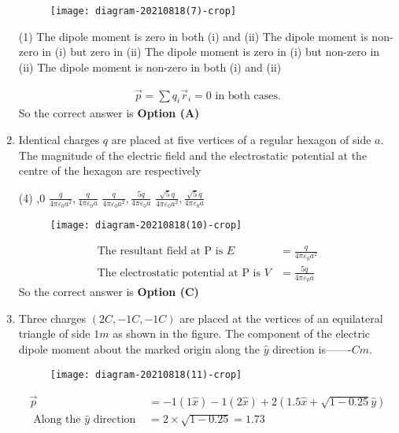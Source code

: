 \begin{enumerate}
\begin{figure}[H]
\centering
\texttt{[image: diagram-20210818(7)-crop]}
\end{figure}
\begin{tasks}(1)
\task[\textbf{A.}] The dipole moment is zero in both (i) and (ii)
\task[\textbf{B.}] The dipole moment is non-zero in (i) but zero in (ii)
\task[\textbf{C.}] The dipole moment is zero in (i) but non-zero in (ii)
\task[\textbf{D.}] The dipole moment is non-zero in both (i) and (ii)
\end{tasks}
\begin{answer}
\begin{align*}
\vec{p}=\sum q_{i} \vec{r}_{i}=0\text{ in both cases.}
\end{align*}
So the correct answer is \textbf{Option (A)}
\end{answer}
	\item Identical charges $q$ are placed at five vertices of a regular hexagon of side $a$. The magnitude of the electric field and the electrostatic potential at the centre of the hexagon are respectively
{}

\begin{tasks}(4)
,0
\task[\textbf{B.}] $\frac{q}{4 \pi \varepsilon_{0} a^{2}}, \frac{q}{4 \pi \varepsilon_{0} a}$
\task[\textbf{C.}] $\frac{q}{4 \pi \varepsilon_{0} a^{2}}, \frac{5 q}{4 \pi \varepsilon_{0} a}$
\task[\textbf{D.}]  $\frac{\sqrt{5} q}{4 \pi \varepsilon_{0} a^{2}}, \frac{\sqrt{5} q}{4 \pi \varepsilon_{0} a}$
\end{tasks}
\begin{answer}
\begin{figure}[H]
	\centering
	\texttt{[image: diagram-20210818(10)-crop]}
\end{figure}
\begin{align*}
\text{The resultant field at }\mathrm{P}\text{ is }E&=\frac{q}{4 \pi \varepsilon_{0} a^{2}}\\
\text{The electrostatic potential at }\mathrm{P}\text{ is }V&=\frac{5 q}{4 \pi \varepsilon_{0} a}
\end{align*}
So the correct answer is \textbf{Option (C)}
\end{answer}
	\item Three charges $(2 C,-1 C,-1 C)$ are placed at the vertices of an equilateral triangle of side $1 m$ as shown in the figure. The component of the electric dipole moment about the marked origin along the $\hat{y}$ direction is-------$C m$.
{}

\begin{figure}[H]
\centering
\texttt{[image: diagram-20210818(11)-crop]}
\end{figure}
\begin{answer}
\begin{align*}
\vec{p}&=-1(1 \hat{x})-1(2 \hat{x})+2(1.5 \hat{x}+\sqrt{1-0.25} \hat{y})\\
\text{	Along the }\hat{y}\text{ direction }&=2 \times \sqrt{1-0.25}=1.73
\end{align*}
\end{answer}
\end{enumerate}
